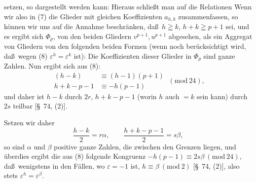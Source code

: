 setzen, so dargestellt werden kann:
Hieraus schlie\ss t man auf die Relationen
Wenn wir also in (7) die Glieder mit gleichen Koeffizienten
$a_{h,k}$ zusammenfassen, so k\"onnen wir uns auf die Annahme
beschr\"anken, da\ss\ $h\geqq k$, $h+k\geqq p+1$ sei, und es ergibt
sich $\Phi_p$, von den beiden Gliedern $v^{p+1}, u^{p+1}$ abgesehen,
als ein Aggregat von Gliedern von den folgenden beiden Formen
(wenn noch ber\"ucksichtigt wird, da\ss\ wegen (8) $\varepsilon^h=\varepsilon^k$ ist):
Die Koeffizienten dieser Glieder in $\Phi_p$ sind ganze Zahlen.
Nun ergibt sich aus (8):
\[
\begin{aligned}
(h-k)&\equiv (h-1)(p+1)\\
h+k-p-1&\equiv -h(p-1)
\end{aligned}
\ (\mathrm{mod}\ 24),
\]
und daher ist $h-k$ durch $2r$, $h+k-p-1$ (worin $h$ auch
$=k$ sein kann) durch $2s$ teilbar [\S\ 74, (2)].

Setzen wir daher
\[
\frac{h-k}{2}=r\alpha, \qquad \frac{h+k-p-1}{2}=s\beta,
\]
so sind $\alpha$ und $\beta$ positive ganze Zahlen, die zwischen
den Grenzen
liegen, und \"uberdies ergibt die aus (8) folgende Kongruenz
$-h(p-1)\equiv 2s\beta\ (\mathrm{mod}\ 24)$, da\ss\ wenigstens in den
F\"allen, wo $\varepsilon=-1$ ist, $h\equiv\beta\ (\mathrm{mod}\ 2)$
[\S\ 74, (2)], also stets $\varepsilon^h=\varepsilon^\beta$.
